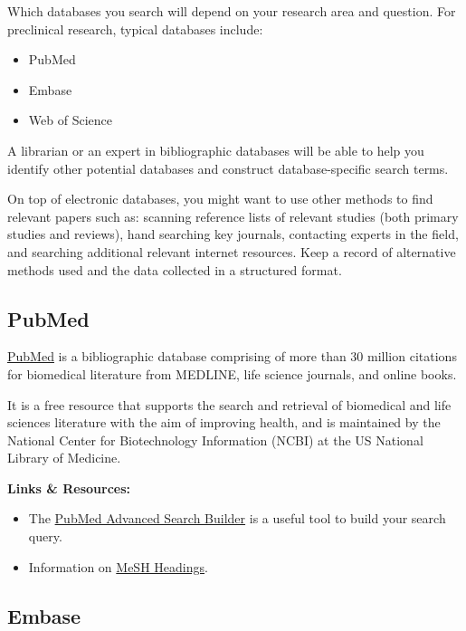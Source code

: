 \documentclass[
]{book}
\begin{document}
Which databases you search will depend on your research area and question. For preclinical research, typical databases include:

\begin{itemize}
\item
  PubMed
\item
  Embase
\item
  Web of Science
\end{itemize}

A librarian or an expert in bibliographic databases will be able to help you identify other potential databases and construct database-specific search terms.

On top of electronic databases, you might want to use other methods to find relevant papers such as: scanning reference lists of relevant studies (both primary studies and reviews), hand searching key journals, contacting experts in the field, and searching additional relevant internet resources. Keep a record of alternative methods used and the data collected in a structured format.

\hypertarget{pubmed}{%
\subsection{PubMed}\label{pubmed}}

\href{https://pubmed.ncbi.nlm.nih.gov/}{PubMed} is a bibliographic database comprising of more than 30 million citations for biomedical literature from MEDLINE, life science journals, and online books.

It is a free resource that supports the search and retrieval of biomedical and life sciences literature with the aim of improving health, and is maintained by the National Center for Biotechnology Information (NCBI) at the US National Library of Medicine.

\textbf{Links \& Resources:}

\begin{itemize}
\item
  The \href{https://www.ncbi.nlm.nih.gov/pubmed/advanced}{PubMed Advanced Search Builder} is a useful tool to build your search query.
\item
  Information on \href{https://www.nlm.nih.gov/mesh/meshhome.html}{MeSH Headings}.
\end{itemize}

\hypertarget{embase}{%
\subsection{Embase}\label{embase}}
\end{document}
